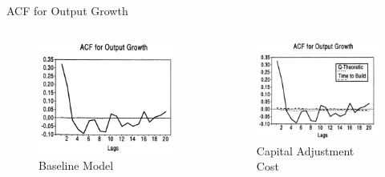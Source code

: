 \documentclass[10pt]{beamer}
\begin{document}
\begin{frame}{ACF for Output Growth}
    \begin{columns}[T,onlytextwidth]
        \begin{figure}
            \centering
            \includegraphics[width=\linewidth]{figures/Bse_ACF.png}
            \caption{Baseline Model}
        \end{figure}

        \begin{figure}
            \centering
            \includegraphics[width=\linewidth]{figures/K_ACF.png}
            \caption{Capital Adjustment Cost}
        \end{figure}


\end{columns}
\end{frame}
\end{document}
